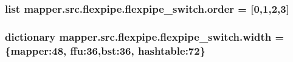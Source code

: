 \subsubsection[{order}]{\setlength{\rightskip}{0pt plus 5cm}list mapper.\+src.\+flexpipe.\+flexpipe\+\_\+switch.\+order = \mbox{[}0,1,2,3\mbox{]}}\label{namespacemapper_1_1src_1_1flexpipe_1_1flexpipe__switch_abee9e96be5924f0094a7173aac274d89}
\hypertarget{namespacemapper_1_1src_1_1flexpipe_1_1flexpipe__switch_a5be9af3f83731b2768fff9dc48fc511f}{}
\subsubsection[{width}]{\setlength{\rightskip}{0pt plus 5cm}dictionary mapper.\+src.\+flexpipe.\+flexpipe\+\_\+switch.\+width = \{\textquotesingle{}mapper\textquotesingle{}\+:48, \textquotesingle{}ffu\textquotesingle{}\+:36,\textquotesingle{}bst\textquotesingle{}\+:36, \textquotesingle{}hashtable\textquotesingle{}\+:72\}}\label{namespacemapper_1_1src_1_1flexpipe_1_1flexpipe__switch_a5be9af3f83731b2768fff9dc48fc511f}
